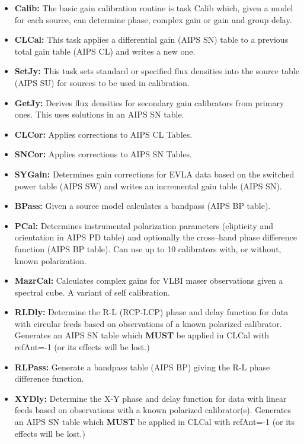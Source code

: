 \documentclass[11pt]{report}
\begin{document}
\begin{itemize}
\item {\bf Calib:} The basic gain calibration routine is task
  Calib which, given a model for each source, can determine phase,
  complex gain or gain and group delay.
\item {\bf CLCal:} This task applies a differential gain (AIPS SN)
  table to a previous total gain table (AIPS CL) and writes a new one.
\item {\bf SetJy:} This task sets standard or specified flux densities
  into the source table (AIPS SU) for sources to be used in calibration.
\item {\bf GetJy:} Derives flux densities for secondary gain
  calibrators from primary ones.  
This uses solutions in an AIPS SN table.
\item {\bf CLCor:} Applies corrections to AIPS CL Tables.
\item {\bf SNCor:} Applies corrections to AIPS SN Tables.
\item {\bf SYGain:} Determines gain corrections for EVLA data based on
  the switched power table (AIPS SW) and writes an incremental gain
  table (AIPS SN).
\item {\bf BPass:} Given a source model calculates a bandpass (AIPS
  BP table).
\item {\bf PCal:} Determines instrumental polarization parameters
  (elipticity and orientation in AIPS PD table) and optionally the
  cross--hand phase difference function (AIPS BP table).
Can use up to 10 calibrators with, or without, known polarization.
\item {\bf MazrCal:} Calculates complex gains for VLBI maser
  observations given a spectral cube.
  A variant of self calibration.
\item {\bf RLDly:} Determine the R-L (RCP-LCP) phase and delay
  function for data with circular feeds based on observations of a
  known polarized  calibrator. 
  Generates an AIPS SN table which {\bf MUST} be applied in CLCal with
  refAnt=-1 (or its effects will be lost.)
\item {\bf RLPass:} Generate a bandpass table (AIPS BP) giving the R-L
  phase difference function.
\item {\bf XYDly:} Determine the X-Y phase and delay function for data
  with linear feeds based on observations with a known polarized
  calibrator(s). 
  Generates an AIPS SN table which {\bf MUST} be applied in CLCal with
  refAnt=-1 (or its effects will be lost.)
\end{itemize}
\end{document}
